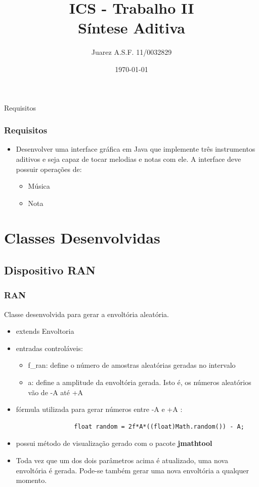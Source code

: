 \documentclass{beamer}
\title[Introdução a Computação Sônica]{ ICS - Trabalho II \\ Síntese Aditiva}
\author{Juarez A.S.F. 11/0032829}
\institute{Universidade de Brasília}
\date{\today}
\begin{document}
\begin{frame}
        \titlepage
\end{frame}


\begin{frame}{Requisitos}
	\frametitle{Requisitos}
    \begin{itemize}
	\item Desenvolver uma interface gráfica em Java que implemente três instrumentos aditivos 
	e seja capaz de tocar melodias e notas com ele. A interface deve possuir operações de:
	\begin{itemize}
	 \item Música
	 \item Nota
	 \end{itemize}
    \end{itemize}
\end{frame}

\section{Classes Desenvolvidas}
\subsection{Dispositivo RAN}
\begin{frame}[fragile]
	\frametitle{RAN}
Classe desenvolvida para gerar a envoltória aleatória.	
	\begin{itemize}
		\item extends Envoltoria
		\item entradas controláveis: 
		\begin{itemize}
			\item f\_ran: define o número de amostras aleatórias geradas no intervalo
			\item a: define a amplitude da envoltória gerada. Isto é, os números aleatórios vão de -A até +A
		\end{itemize}
		\item fórmula utilizada para gerar números entre -A e +A :
		\begin{tiny}	\begin{lstlisting}
				float random = 2f*A*((float)Math.random()) - A;		    				
		\end{lstlisting} \end{tiny}	
		
		\item possui método de visualização gerado com o pacote \textbf{jmathtool}					\item Toda vez que um dos dois parâmetros acima é atualizado, uma nova envoltória
		é gerada. Pode-se também gerar uma nova envoltória a qualquer momento.
	\end{itemize}
\end{frame}
\end{document}
